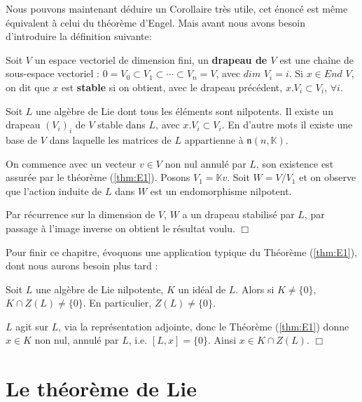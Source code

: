 \documentclass[a4paper,openany,12pt]{report}
\newcommand{\KK}{\mathbb{K}}
\newcommand{\nn}{\mathfrak{n}}
\theoremstyle{break}
{\theorembodyfont{\upshape}
\newtheorem*{rmq}{Remarque :}
\newtheorem*{prv}{Preuve :}
\newtheorem*{ex}{Exemples :}
\newtheorem*{exe}{Exemple : }
\newtheorem*{nota}{Notation :}
\newtheorem*{dem}{D\'emonstration :}}
\begin{document}
Nous pouvons maintenant déduire un Corollaire très utile, cet énoncé est même équivalent à celui du théorème d'Engel. Mais avant nous avons besoin d'introduire la définition suivante:

\begin{df}
\quad Soit $V$ un espace vectoriel de dimension fini, un \textbf{drapeau de $V$} est une chaîne de sous-espace vectoriel : $0 = V_{0} \subset V_{1} \subset \cdots \subset V_{n} = V$, avec $dim$ $V_{i} = i$.
Si $x \in End$ $V$, on dit que $x$ est \textbf{stable} si on obtient, avec le drapeau précédent, $x.V_{i} \subset V_{i}$, $\forall i$.
\end{df}

\begin{cor}\label{cor:E1}
\quad Soit $L$ une algèbre de Lie dont tous les éléments sont nilpotents. Il existe un drapeau $(V_{i})_{i}$ de $V$ stable dans $L$, avec $x.V_{i} \subset V_{i}$. En d'autre mots il existe une base de $V$ dans laquelle les matrices de $L$ appartienne à $\nn(n,\KK)$.
\end{cor}

\begin{prv}
\quad On commence avec un vecteur $v \in V$ non nul annulé par $L$, son existence est assurée par le théorème (\ref{thm:E1}). Posons $V_{1} = \KK v$. Soit $W= V/V_{1}$ et on observe que l'action induite de $L$ dans $W$ est un endomorphisme nilpotent.

Par récurrence sur la dimension de $V$, $W$ a un drapeau stabilisé par $L$, par passage à l'image inverse on obtient le résultat voulu. $\Box$
\end{prv}

Pour finir ce chapitre, évoquons une application  typique du Théorème (\ref{thm:E1}), dont nous aurons besoin plus tard : 

\begin{lem}\label{lem:E2}
\quad Soit $L$ une algèbre de Lie nilpotente, $K$ un idéal de $L$. Alors si $K \neq \{0\}$, $K \cap Z(L) \neq \{ 0 \}$.
En particulier, $Z(L) \neq \{ 0 \}$.
\end{lem}

\begin{prv}
\quad $L$ agit sur $L$, via la représentation adjointe, donc le Théorème (\ref{thm:E1}) donne $x \in K$ non nul, annulé par $L$, i.e. $[L,x]= \{0 \}$. Ainsi $x \in K \cap Z(L)$. $\Box$
\end{prv}

\chapter{Le théorème de Lie}
\end{document}
